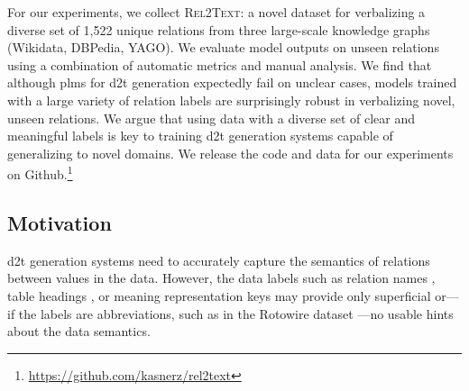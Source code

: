 For our experiments, we collect \textsc{Rel2Text}: a novel dataset for verbalizing a diverse set of 1,522 unique relations from three large-scale knowledge graphs (Wikidata, DBPedia, YAGO). We evaluate model outputs on unseen relations using a combination of automatic metrics and manual analysis. We find that although \acp{plm} for \ac{d2t} generation expectedly fail on unclear cases, models trained with a large variety of relation labels are surprisingly robust in verbalizing novel, unseen relations. We argue that using data with a diverse set of clear and meaningful labels is key to training \ac{d2t} generation systems capable of generalizing to novel domains. We release the code and data for our experiments on Github.\footnote{\url{https://github.com/kasnerz/rel2text}}


% 

\subsection{Motivation}
\ac{d2t} generation systems need to accurately capture the semantics of relations between values in the data. However, the data labels such as relation names \cite{farber2018linked,haller2022analysis}, table headings \cite{parikhToTToControlledTableToText2020}, or meaning representation keys \cite{dusekEvaluatingStateoftheartEndtoEnd2020} may provide only superficial or---if the labels are abbreviations, such as in the Rotowire dataset \cite{wiseman2017challenges}---no usable hints about the data semantics.



